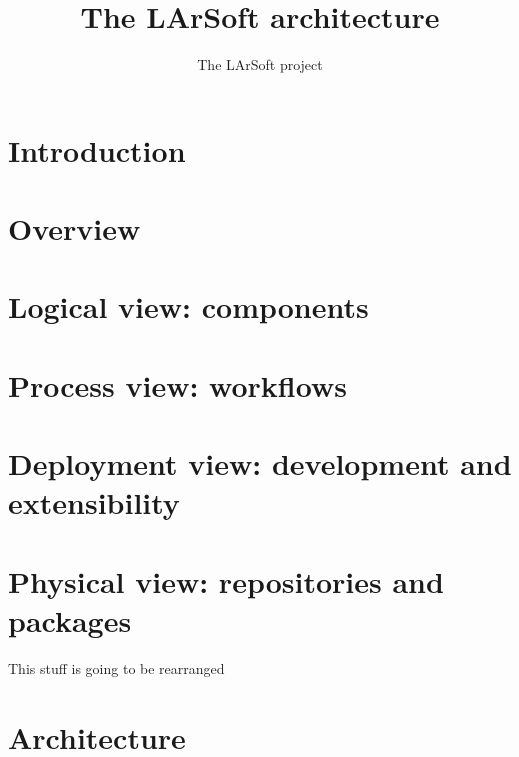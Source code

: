 \documentclass{article}
\begin{document}
\title{The LArSoft architecture}
\author{The LArSoft project}
\maketitle

\tableofcontents

\section{Introduction}
\label{sec:introduction}




\section{Overview}
\label{sec:Overview}




\section{Logical view: components}
\label{sec:Components}




\section{Process view: workflows}
\label{sec:Workflows}




\section{Deployment view: development and extensibility}
\label{sec:Development}




\section{Physical view: repositories and packages}
\label{sec:Packages}





\clearpage
\appendix

This stuff is going to be rearranged

\section{Architecture}\label{architecture}
\end{document}
